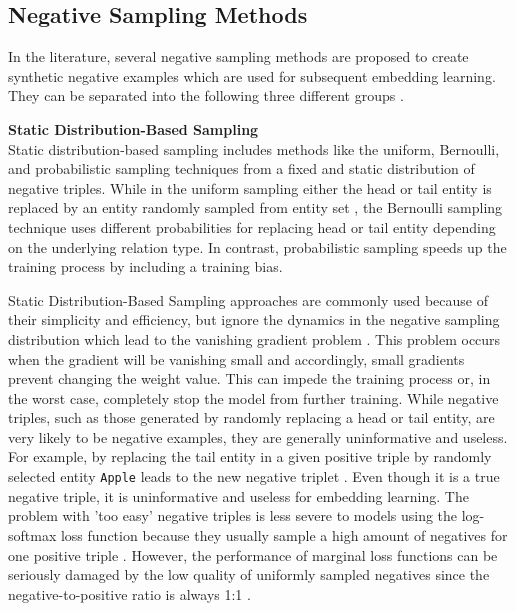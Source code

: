 \subsection{Negative Sampling Methods} 
\label{subsec:negative_sampling_methods}
%
In the literature, several negative sampling methods are proposed to create synthetic negative examples which are used for subsequent embedding learning.
They can be separated into the following three different groups \cite{qianunderstanding}.

\textbf{Static Distribution-Based Sampling} \label{static_distribution_based_sampling}\\
Static distribution-based sampling includes methods like the uniform, Bernoulli, and probabilistic sampling techniques from a fixed and static distribution of negative triples.
While in the uniform sampling either the head or tail entity is replaced by an entity randomly sampled from entity set \entities,
the Bernoulli sampling technique uses different probabilities for replacing head or tail entity depending on the underlying relation type.
In contrast, probabilistic sampling speeds up the training process by including a training bias.
	
Static Distribution-Based Sampling approaches are commonly used because of their simplicity and efficiency, but ignore the dynamics in the negative sampling distribution which lead to the vanishing gradient problem \cite{qianunderstanding}.
This problem occurs when the gradient will be vanishing small and accordingly, small gradients prevent changing the weight value.
This can impede the training process or, in the worst case, completely stop the model from further training.
While negative triples, such as those generated by randomly replacing a head or tail entity, are very likely to be negative examples, they are generally uninformative and useless.
For example, by replacing the tail entity in a given positive triple by randomly selected entity \texttt{Apple} leads to the new negative triplet .
Even though it is a true negative triple, it is uninformative and useless for embedding learning.
The problem with 'too easy' negative triples is less severe to models using the log-softmax loss function because they usually sample a high amount of negatives for one positive triple \cite{cai2017kbgan}.
However, the performance of marginal loss functions can be seriously damaged by the low quality of uniformly sampled negatives since the negative-to-positive ratio is always 1:1 \cite{cai2017kbgan}.



